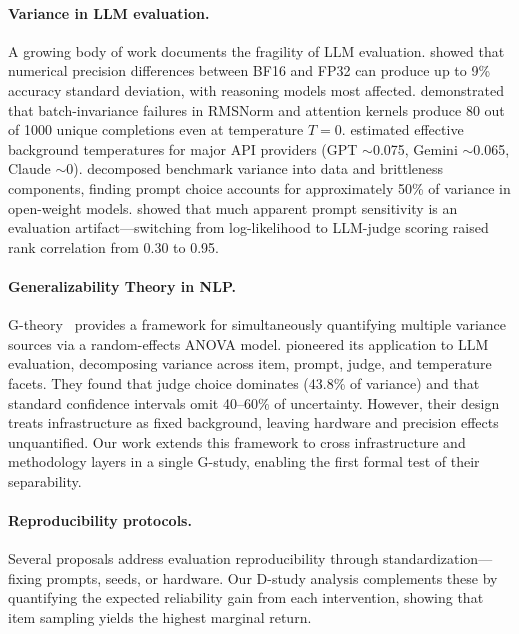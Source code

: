 \documentclass[letterpaper,11pt]{article}
\begin{document}
\paragraph{Variance in LLM evaluation.}
A growing body of work documents the fragility of LLM evaluation.
\citet{yuan2025} showed that numerical precision differences between BF16 and FP32 can produce up to 9\% accuracy standard deviation, with reasoning models most affected.
\citet{thinkingmachines2025} demonstrated that batch-invariance failures in RMSNorm and attention kernels produce 80 out of 1000 unique completions even at temperature $T{=}0$.
\citet{messina2026} estimated effective background temperatures for major API providers (GPT $\sim$0.075, Gemini $\sim$0.065, Claude $\sim$0).
\citet{brittlebench2026} decomposed benchmark variance into data and brittleness components, finding prompt choice accounts for approximately 50\% of variance in open-weight models.
\citet{hua2025} showed that much apparent prompt sensitivity is an evaluation artifact---switching from log-likelihood to LLM-judge scoring raised rank correlation from 0.30 to 0.95.

\paragraph{Generalizability Theory in NLP.}
G-theory~\citep{cronbach1972} provides a framework for simultaneously quantifying multiple variance sources via a random-effects ANOVA model.
\citet{mesting2026} pioneered its application to LLM evaluation, decomposing variance across item, prompt, judge, and temperature facets.
They found that judge choice dominates (43.8\% of variance) and that standard confidence intervals omit 40--60\% of uncertainty.
However, their design treats infrastructure as fixed background, leaving hardware and precision effects unquantified.
Our work extends this framework to cross infrastructure and methodology layers in a single G-study, enabling the first formal test of their separability.

\paragraph{Reproducibility protocols.}
Several proposals address evaluation reproducibility through standardization---fixing prompts, seeds, or hardware.
Our D-study analysis complements these by quantifying the expected reliability gain from each intervention, showing that item sampling yields the highest marginal return.
\end{document}
